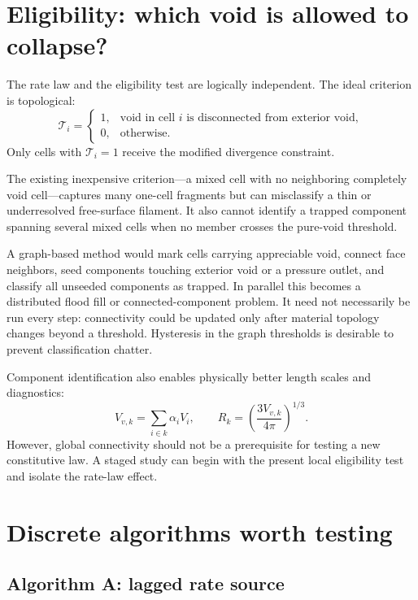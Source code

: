 \documentclass[11pt]{article}
\newcommand{\trapped}{\mathcal{T}}
\begin{document}
\section{Eligibility: which void is allowed to collapse?}

The rate law and the eligibility test are logically independent.  The ideal criterion is
topological:
\begin{equation}
  \trapped_i=
  \begin{cases}
    1, & \text{void in cell \(i\) is disconnected from exterior void},\\
    0, & \text{otherwise}.
  \end{cases}
\end{equation}
Only cells with \(\trapped_i=1\) receive the modified divergence constraint.

The existing inexpensive criterion---a mixed cell with no neighboring completely void
cell---captures many one-cell fragments but can misclassify a thin or underresolved
free-surface filament.  It also cannot identify a trapped component spanning several
mixed cells when no member crosses the pure-void threshold.

A graph-based method would mark cells carrying appreciable void, connect face neighbors,
seed components touching exterior void or a pressure outlet, and classify all unseeded
components as trapped.  In parallel this becomes a distributed flood fill or
connected-component problem.  It need not necessarily be run every step: connectivity
could be updated only after material topology changes beyond a threshold.  Hysteresis in
the graph thresholds is desirable to prevent classification chatter.

Component identification also enables physically better length scales and diagnostics:
\begin{equation}
  V_{v,k}=\sum_{i\in k}\alpha_i V_i,
  \qquad
  R_{k}=\left(\frac{3V_{v,k}}{4\pi}\right)^{1/3}.
\end{equation}
However, global connectivity should not be a prerequisite for testing a new constitutive
law.  A staged study can begin with the present local eligibility test and isolate the
rate-law effect.

\section{Discrete algorithms worth testing}

\subsection{Algorithm A: lagged rate source}
\end{document}
